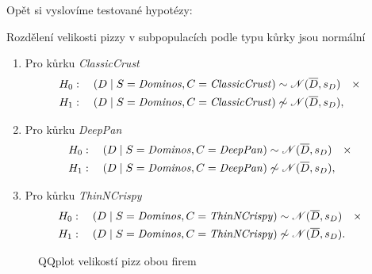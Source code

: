 \documentclass[czech]{article}
\newcommand\against{\ensuremath{\quad\times\quad}}
\begin{document}
Opět si vyslovíme testované hypotézy:

\begin{hypothesis}
	\label{hyp:normalita_rozdeleni_velikosti_pizz_pro_firmu_dominos_v_subpopulacich_podle_typu_kurky}
	Rozdělení velikosti pizzy v subpopulacích podle typu kůrky jsou normální
	\begin{enumerate}[label=(\alph*)]
		\item Pro kůrku \emph{ClassicCrust}
		      \label{hyp:normalita_rozdeleni_velikosti_pizz_pro_firmu_dominos_v_subpopulacich_podle_typu_kurky_a}
		      \[
			      \begin{split}
				      &H_0: \quad (D \mid S = \text{\emph{Dominos}}, C = \text{\emph{ClassicCrust}}) \sim
				      \mathscr{N}(\overline{D}, s_D)  \against \\
				      &H_1: \quad (D \mid S =
				      \text{\emph{Dominos}}, C = \text{\emph{ClassicCrust}}) \not\sim
				      \mathscr{N}(\overline{D}, s_D),
			      \end{split}
		      \]
		\item Pro kůrku \emph{DeepPan}
		      \label{hyp:normalita_rozdeleni_velikosti_pizz_pro_firmu_dominos_v_subpopulacich_podle_typu_kurky_b}
		      \[
			      \begin{split}
				      &H_0: \quad (D \mid S = \text{\emph{Dominos}}, C = \text{\emph{DeepPan}}) \sim
				      \mathscr{N}(\overline{D}, s_D) \against\\
				      &H_1: \quad (D \mid S = \text{\emph{Dominos}}, C = \text{\emph{DeepPan}}) \not\sim \mathscr{N}(\overline{D},
				      s_D),
			      \end{split}
		      \]
		\item Pro kůrku \emph{ThinNCrispy}
		      \label{hyp:normalita_rozdeleni_velikosti_pizz_pro_firmu_dominos_v_subpopulacich_podle_typu_kurky_c}
		      \[
			      \begin{split}
				      &H_0: \quad (D \mid S = \text{\emph{Dominos}}, C = \text{\emph{ThinNCrispy}}) \sim
				      \mathscr{N}(\overline{D}, s_D) \against\\
				      &H_1: \quad (D \mid S = \text{\emph{Dominos}}, C = \text{\emph{ThinNCrispy}})
				      \not\sim \mathscr{N}(\overline{D}, s_D).
			      \end{split}
		      \]
	\end{enumerate}
\end{hypothesis}

\begin{figure}[H]

	\centering
	\label{fig:qqplots_stores}
	
	\caption{QQplot velikostí pizz obou firem}
\end{figure}
\end{document}
